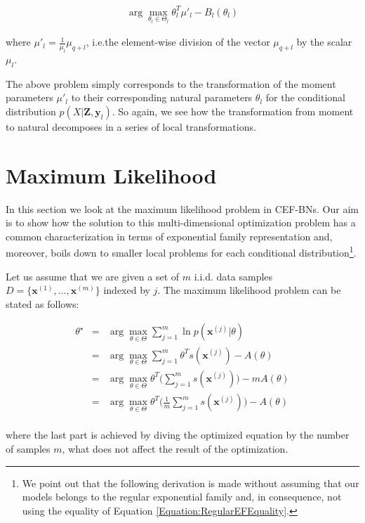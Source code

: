 \documentclass[11pt, oneside]{article}   	%
\newcommand{\bm}{\mathbf}
\numberwithin{figure}{section}
\numberwithin{equation}{section}
\numberwithin{table}{section}
\theoremstyle{definition}
\begin{document}
\begin{eqnarray}
\label{Equation:CD_With_MParents:MomentToNatural}
\arg\max_{\theta_l \in \Theta_l} \theta_l^T\mu'_l - B_l(\theta_l)
\end{eqnarray}

\noindent where $\mu'_l =\frac{1}{\mu_{l}}\mu_{q+l}$, i.e.the element-wise division of the vector $\mu_{q+l}$ by the scalar $\mu_l$.

The above problem simply corresponds to the transformation of the moment parameters $\mu'_l$ to their corresponding natural parameters $\theta_l$ for the conditional distribution $p(X|\bm Z, \bm y_l)$. So again, we see how the transformation from moment to natural decomposes in a series of local transformations. 


\section{Maximum Likelihood}

In this section we look at the maximum likelihood problem in CEF-BNs. Our aim is to show how the solution to this multi-dimensional optimization problem has a common characterization in terms of exponential family representation and, moreover, boils down to smaller local problems for each conditional distribution\footnote{We point out that the following derivation is made without assuming that our models belongs to the regular exponential family and, in consequence, not using the equality of Equation \ref{Equation:RegularEFEquality}.}.

Let us assume that we are given a set of $m$ i.i.d. data samples $D=\{\bm x^{(1)}, \ldots, \bm x^{(m)}\}$ indexed by $j$. The maximum likelihood problem can be stated as follows:

\begin{eqnarray*}
\theta^\star  &=& \arg\max_{\theta \in \Theta} \sum_{j=1}^m \ln p(\bm x^{(j)}|\theta) \\
&=& \arg\max_{\theta \in \Theta} \sum_{j=1}^m \theta^Ts(\bm x^{(j)})  - A(\theta) \\
&=& \arg\max_{\theta \in \Theta} \theta^T\Big(\sum_{j=1}^m s(\bm x^{(j)})\Big)  - m A(\theta) \\
&=& \arg\max_{\theta \in \Theta} \theta^T\Big(\frac{1}{m}\sum_{j=1}^m s(\bm x^{(j)})\Big)  - A(\theta) \\
\end{eqnarray*}

\noindent where the last part is achieved by diving the optimized equation by the number of samples $m$, what does not affect the result of the optimization. 
\end{document}
